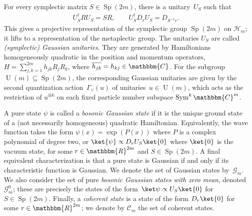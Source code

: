 \documentclass[11pt,a4paper]{article}
\numberwithin{equation}{section}
\newcommand{\ot}{\otimes}
\newcommand{\RR}{\mathbbm{R}}
\newcommand{\CC}{\mathbbm{C}}
\newcommand{\HH}{\mathcal{H}}
\newcommand{\GG}{\mathcal G}
\newcommand{\1}{\mathbf{1}}
\DeclareMathOperator{\Sp}{Sp}
\DeclareMathOperator{\U}{U}
\DeclareMathOperator{\Sym}{Sym}
\begin{document}
For every symplectic matrix $S \in \Sp(2m)$, there is a unitary~$U_S$ such that
\begin{align*}
    U_S^\dagger R U_S = S R, \qquad U_S^\dagger D_r U_S = D_{S^{-1}r}.
\end{align*}
This gives a projective representation of the symplectic group $\Sp(2m)$ on $\HH_m$;
it lifts to a representation of the metaplectic group.
The unitaries $U_S$ are called \emph{(symplectic) Gaussian unitaries}.
They are generated by Hamiltonians homogeneously quadratic in the position and momentum operators, $H = \sum_{j,k=1}^{2m} h_{jk} R_j R_k$, where $\overline{h_{jk}} = h_{kj} \in \CC$.
For the subgroup $\U(m) \subseteq \Sp(2m)$, the corresponding Gaussian unitaries are given by the second quantization action~$\Gamma_{\vee}(u)$ of unitaries~$u\in\U(m)$, which acts as the restriction of $u^{\ot k}$ on each fixed particle number subspace $\Sym^k \CC^m$.


A pure state $\psi$ is called a \emph{bosonic Gaussian state} if it is the unique ground state of a (not necessarily homogeneous) quadratic Hamiltonian.
Equivalently, the wave function takes the form $\psi(x) = \exp(P(x))$ where $P$ is a complex polynomial of degree two, or $\ket{\psi} \propto D_r U_S \ket{0}$ where $\ket{0}$ is the vacuum state, for some $r \in \RR^{2m}$ and $S \in \Sp(2m)$.
A final equivalent characterization is that a pure state is Gaussian if and only if its characteristic function is Gaussian.
We denote the set of Gaussian states by~$\GG_m$.
We also consider the set of pure \emph{bosonic Gaussian states with zero mean}, denoted $\GG_m^0$; these are precisely the states of the form~$\ket\psi \propto U_S \ket{0}$ for $S \in \Sp(2m)$.
Finally, a \emph{coherent state} is a state of the form $D_r \ket{0}$ for some $r \in \RR^{2m}$; we denote by $\mathcal C_m$ the set of coherent states.

\end{document}
